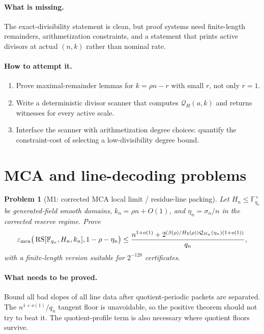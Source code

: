 \documentclass[11pt]{article}
\newtheorem{problem}[theorem]{Problem}
\theoremstyle{definition}
\theoremstyle{remark}
\newcommand{\F}{\mathbb F}
\newcommand{\RS}{\operatorname{RS}}
\newcommand{\emca}{\varepsilon_{\rm mca}}
\newcommand{\Hbin}{H_2}
\newcommand{\Qprof}{\mathcal Q}
\begin{document}
\paragraph{What is missing.}  The exact-divisibility statement is clean, but proof systems need finite-length remainders, arithmetization constraints, and a statement that prints active divisors at actual $(n,k)$ rather than nominal rate.

\paragraph{How to attempt it.}
\begin{enumerate}[leftmargin=2.2em]
\item Prove maximal-remainder lemmas for $k=\rho n-r$ with small $r$, not only $r=1$.
\item Write a deterministic divisor scanner that computes $\Qprof_H(a,k)$ and returns witnesses for every active scale.
\item Interface the scanner with arithmetization degree choices: quantify the constraint-cost of selecting a low-divisibility degree bound.
\end{enumerate}

\section{MCA and line-decoding problems}
\label{sec:mca-problems}

\begin{problem}[M1: corrected MCA local limit / residue-line packing]
\label{prob:M1}
Let $H_n\le\F_{q_n}^{\times}$ be generated-field smooth domains, $k_n=\rho n+O(1)$, and $\eta_n=\sigma_n/n$ in the corrected reserve regime.  Prove
\[
        \emca\big(\RS[\F_{q_n},H_n,k_n],1-\rho-\eta_n\big)
        \le
        \frac{n^{1+o(1)}+2^{(\beta(\rho)/\Hbin(\rho))\Qprof_{H_n}(\eta_n)(1+o(1))}}{q_n},
\]
with a finite-length version suitable for $2^{-128}$ certificates.
\end{problem}

\paragraph{What needs to be proved.}  Bound all bad slopes of all line data after quotient-periodic packets are separated.  The $n^{1+o(1)}/q_n$ tangent floor is unavoidable, so the positive theorem should not try to beat it.  The quotient-profile term is also necessary where quotient floors survive.
\end{document}
